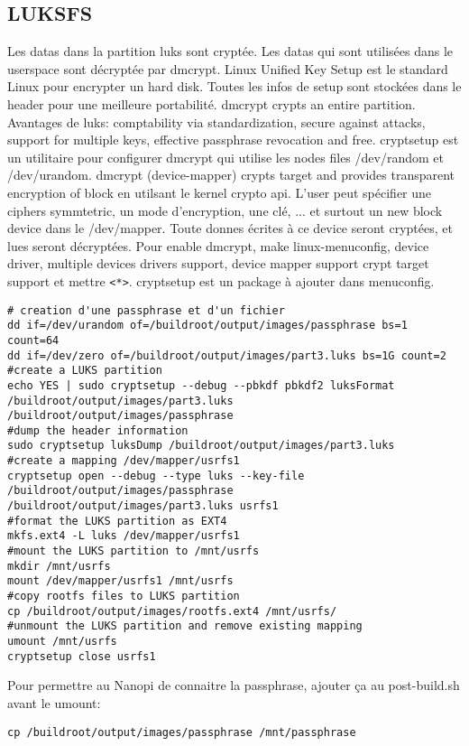 \subsection{LUKSFS}
Les datas dans la partition luks sont cryptée. Les datas qui sont utilisées dans le userspace sont décryptée par dmcrypt. Linux Unified Key Setup est le standard Linux pour encrypter un hard disk. Toutes les infos de setup sont stockées dans le header pour une meilleure portabilité. dmcrypt crypts an entire partition. Avantages de luks: comptability via standardization, secure against attacks, support for multiple keys, effective passphrase revocation and free. cryptsetup est un utilitaire pour configurer dmcrypt qui utilise les nodes files /dev/random et /dev/urandom. dmcrypt (device-mapper) crypts target and provides transparent encryption of block en utilsant le kernel crypto api. L'user peut spécifier une ciphers symmtetric, un mode d'encryption, une clé, ... et surtout un new block device dans le /dev/mapper. Toute donnes écrites à ce device seront cryptées, et lues seront décryptées. Pour enable dmcrypt, make linux-menuconfig, device driver, multiple devices drivers support, device mapper support crypt target support et mettre \verb!<*>!. cryptsetup est un package à ajouter dans menuconfig.
\begin{lstlisting}[style=bash]
# creation d'une passphrase et d'un fichier
dd if=/dev/urandom of=/buildroot/output/images/passphrase bs=1 count=64
dd if=/dev/zero of=/buildroot/output/images/part3.luks bs=1G count=2
#create a LUKS partition
echo YES | sudo cryptsetup --debug --pbkdf pbkdf2 luksFormat
/buildroot/output/images/part3.luks /buildroot/output/images/passphrase
#dump the header information
sudo cryptsetup luksDump /buildroot/output/images/part3.luks
#create a mapping /dev/mapper/usrfs1
cryptsetup open --debug --type luks --key-file
/buildroot/output/images/passphrase /buildroot/output/images/part3.luks usrfs1
#format the LUKS partition as EXT4
mkfs.ext4 -L luks /dev/mapper/usrfs1
#mount the LUKS partition to /mnt/usrfs
mkdir /mnt/usrfs
mount /dev/mapper/usrfs1 /mnt/usrfs
#copy rootfs files to LUKS partition
cp /buildroot/output/images/rootfs.ext4 /mnt/usrfs/
#unmount the LUKS partition and remove existing mapping
umount /mnt/usrfs
cryptsetup close usrfs1
\end{lstlisting}
Pour permettre au Nanopi de connaitre la passphrase, ajouter ça au post-build.sh avant le umount: 
\begin{lstlisting}[style=bash]
cp /buildroot/output/images/passphrase /mnt/passphrase
\end{lstlisting}
